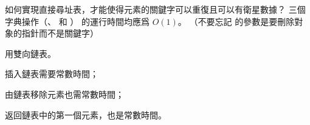 \startEXERCISE
如何實現直接尋址表，才能使得元素的關鍵字可以重復且可以有衛星數據？
三個字典操作（、  和 ）
的運行時間均應爲 $O(1)$。
（不要忘記  的參數是要刪除對象的指針而不是關鍵字）
\stopEXERCISE

\startANSWER
用雙向鏈表。

\startigBase[a]
\item {} 插入鏈表需要常數時間；
\item {} 由鏈表移除元素也需常數時間；
\item {} 返回鏈表中的第一個元素，也是常數時間。
\stopigBase
\stopANSWER

